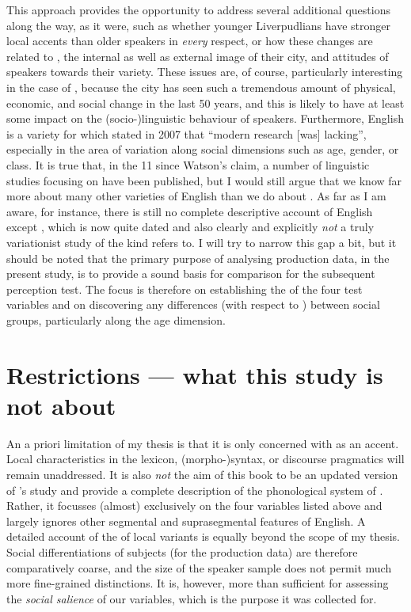 This approach provides the opportunity to address several additional questions along the way, as it were, such as whether younger Liverpudlians have stronger local accents than older speakers in \emph{every} respect, or how these changes are related to , the internal as well as external image of their city, and attitudes of speakers towards their variety.
These issues are, of course, particularly interesting in the case of , because the city has seen such a tremendous amount of physical, economic, and social change in the last 50 years, and this is likely to have at least some impact on the (socio-)linguistic behaviour of speakers.
Furthermore,  English is a variety for which \textcite[351]{watson2007} stated in 2007 that ``modern research [was] lacking'', especially in the area of variation along social dimensions such as age, gender, or class.
It is true that, in the 11 since Watson's claim, a number of linguistic studies focusing on  have been published, but I would still argue that we know far more about many other varieties of English than we do about .
As far as I am aware, for instance, there is still no complete descriptive account of  English except \cite{knowles1973}, which is now quite dated and also clearly and explicitly \emph{not} a truly variationist study of the kind \textcite{watson2007} refers to.
I will try to narrow this gap a bit, but it should be noted that the primary purpose of analysing production data, in the present study, is to provide a sound basis for comparison for the subsequent perception test.
The focus is therefore on establishing the  of the four test variables and on discovering any differences (with respect to ) between social groups, particularly along the age dimension.

\section{Restrictions --- what this study is not about}
\label{sec.intro.restrict}

An a priori limitation of my thesis is that it is only concerned with  as an accent.
Local characteristics in the lexicon, (morpho-)syntax, or discourse pragmatics will remain unaddressed.
It is also \emph{not} the aim of this book to be an updated version of \citeauthor{knowles1973}'s \citeyear{knowles1973} study and provide a complete description of the phonological system of .
Rather, it focusses (almost) exclusively on the four variables listed above and largely ignores other segmental and suprasegmental features of  English.
A detailed account of the  of local variants is equally beyond the scope of my thesis.
Social differentiations of subjects (for the production data) are therefore comparatively coarse, and the size of the speaker sample does not permit much more fine-grained distinctions.
It is, however, more than sufficient for assessing the \emph{social salience} of our variables, which is the purpose it was collected for.

